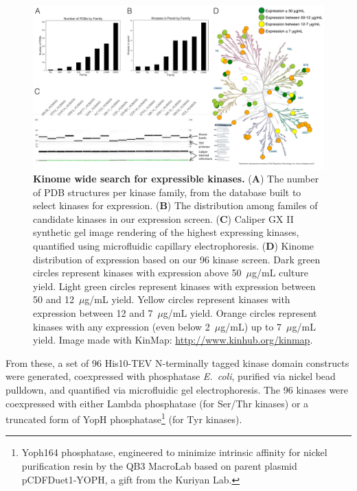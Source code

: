 \documentclass[9pt,lineno]{elife}
\begin{document}
\begin{figure}[b!]
\centering
  \begin{fullwidth}
   \includegraphics[width=\linewidth]{96-kinase-figure}
  \caption{{\bf Kinome wide search for expressible kinases.}
  ({\bf A}) The number of PDB structures per kinase family, from the database built to select kinases for expression. ({\bf B}) The distribution among familes of candidate kinases in our expression screen. ({\bf C}) Caliper GX II synthetic gel image rendering of the highest expressing kinases, quantified using microfluidic capillary electrophoresis.  ({\bf D}) Kinome distribution of expression based on our 96 kinase screen. Dark green circles represent kinases with expression above 50~$\mu$g/mL culture yield.
  Light green circles represent kinases with expression between 50 and 12~$\mu$g/mL yield.
  Yellow circles represent kinases with expression between 12 and 7~$\mu$g/mL yield.
  Orange circles represent kinases with any expression (even below 2~$\mu$g/mL) up to 7~$\mu$g/mL yield.
  Image made with KinMap: \href{http://www.kinhub.org/kinmap}{http://www.kinhub.org/kinmap}. 
   }
  \label{fig:kinome-expression}
  \end{fullwidth}
\end{figure}

From these, a set of 96 His10-TEV N-terminally tagged kinase domain constructs were generated, coexpressed with phosphatase \emph{E.~coli}, purified via nickel bead pulldown, and quantified via microfluidic gel electrophoresis.
The 96 kinases were coexpressed with either Lambda phosphatase (for Ser/Thr kinases) or a truncated form of YopH phosphatase\footnote{Yoph164 phosphatase, engineered to minimize intrinsic affinity for nickel purification resin by the QB3 MacroLab based on parent plasmid pCDFDuet1-YOPH, a gift from the Kuriyan Lab.} (for Tyr kinases). 
\end{document}
